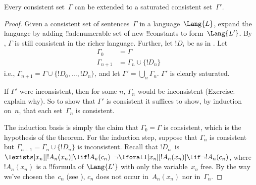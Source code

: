 \documentclass[../../../include/open-logic-section]{subfiles}
\begin{document}
\begin{lem}
Every consistent set~$\Gamma$ can be extended to a saturated
consistent set~$\Gamma'$.
\end{lem}

\begin{proof}
Given a consistent set of sentences~$\Gamma$ in a language~$\Lang{L}$,
expand the language by adding !!a{denumerable} set of new
!!{constant}s to form~$\Lang{L'}$.  By , $\Gamma$
is still consistent in the richer language.  Further, let $!D_i$ be as
in .  Let
\begin{align*}
\Gamma_0 & = \Gamma \\
\Gamma_{n+1} & = \Gamma_n \cup \{!D_n \}
\end{align*}
i.e., $\Gamma_{n+1} = \Gamma \cup \{ !D_0, \dots, !D_n \}$, and let
$\Gamma' = \bigcup_{n} \Gamma_n$.  $\Gamma'$ is clearly saturated.

If $\Gamma'$ were inconsistent, then for some $n$, $\Gamma_n$ would be
inconsistent (Exercise: explain why).  So to show that $\Gamma'$ is
consistent it suffices to show, by induction on~$n$, that each
set~$\Gamma_n$ is consistent.

The induction basis is simply the claim that $\Gamma_0 = \Gamma$ is
consistent, which is the hypothesis of the theorem.  For the induction
step, suppose that $\Gamma_{n}$ is consistent but $\Gamma_{n+1} =
\Gamma_n \cup \{!D_n\}$ is inconsistent.  Recall that $!D_n$~is
{$\lexists[x_{n}][!A_{n}(x_n)] \lif !A_{n}(c_{n})$}
{$\lnot\lforall[x_{n}][!A_{n}(x_n)] \lif \lnot !A_{n}(c_{n})$},
where $!A_n(x_n)$ is a !!{formula} of $\Lang{L'}$ with only the
variable~$x_n$ free. By the way we've chosen the~$c_n$ (see
), $c_n$ does not occur in~$A_n(x_n)$ nor
in~$\Gamma_n$.


\end{proof}
\end{document}
